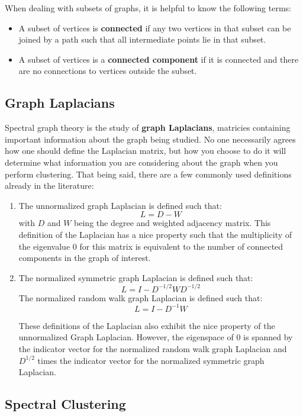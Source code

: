 \documentclass{article}
\begin{document}
When dealing with subsets of graphs, it is helpful to know the following terms:
\begin{itemize}
\item A subset of vertices is \textbf{connected} if any two vertices in that subset can be joined by a path such that all intermediate points lie in that subset.
\item A subset of vertices is a \textbf{connected component} if it is connected and there are no connections to vertices outside the subset.
\end{itemize}

\subsection{Graph Laplacians}

Spectral graph theory is the study of \textbf{graph Laplacians}, matricies containing important information about the graph being studied. No one necessarily agrees how one should define the Laplacian matrix, but how you choose to do it will determine what information you are considering about the graph when you perform clustering. That being said, there are a few commonly used definitions already in the literature:
\begin{enumerate}
\item  The unnormalized graph Laplacian is defined such that: $$ L = D - W$$ with $D$ and $W$ being the degree and weighted adjacency matrix. This definition of the Laplacian has a nice property such that the multiplicity of the eigenvalue 0 for this matrix is equivalent to the number of connected components in the graph of interest. 

\item The normalized symmetric graph Laplacian is defined such that: $$ L = I - D^{-1/2}WD^{-1/2}$$
The normalized random walk graph Laplacian is defined such that: $$ L = I - D^{-1}W$$



These definitions of the Laplacian also exhibit the nice property of the unnormalized Graph Laplacian. However, the eigenspace of 0 is spanned by the indicator vector for the normalized random walk graph Laplacian and $D^{1/2}$ times the indicator vector for the normalized symmetric graph Laplacian.

\end{enumerate}

\subsection{Spectral Clustering}
\end{document}
